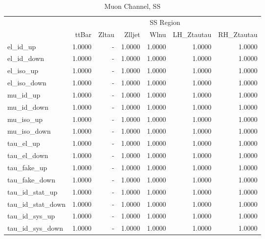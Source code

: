 \documentclass[11pt,oneside,a4paper]{article}
\begin{document}
\begin{table}
\begin{tabular}{lrrrrrr}
 & \multicolumn{6}{c}{SS Region} \\
 & ttBar & Zltau & Zlljet & Wlnu & LH\_Ztautau & RH\_Ztautau \\
el\_id\_up & 1.0000 & - & 1.0000 & 1.0000 & 1.0000 & 1.0000 \\
el\_id\_down & 1.0000 & - & 1.0000 & 1.0000 & 1.0000 & 1.0000 \\
el\_iso\_up & 1.0000 & - & 1.0000 & 1.0000 & 1.0000 & 1.0000 \\
el\_iso\_down & 1.0000 & - & 1.0000 & 1.0000 & 1.0000 & 1.0000 \\
mu\_id\_up & 1.0000 & - & 1.0000 & 1.0000 & 1.0000 & 1.0000 \\
mu\_id\_down & 1.0000 & - & 1.0000 & 1.0000 & 1.0000 & 1.0000 \\
mu\_iso\_up & 1.0000 & - & 1.0000 & 1.0000 & 1.0000 & 1.0000 \\
mu\_iso\_down & 1.0000 & - & 1.0000 & 1.0000 & 1.0000 & 1.0000 \\
tau\_el\_up & 1.0000 & - & 1.0000 & 1.0000 & 1.0000 & 1.0000 \\
tau\_el\_down & 1.0000 & - & 1.0000 & 1.0000 & 1.0000 & 1.0000 \\
tau\_fake\_up & 1.0000 & - & 1.0000 & 1.0000 & 1.0000 & 1.0000 \\
tau\_fake\_down & 1.0000 & - & 1.0000 & 1.0000 & 1.0000 & 1.0000 \\
tau\_id\_stat\_up & 1.0000 & - & 1.0000 & 1.0000 & 1.0000 & 1.0000 \\
tau\_id\_stat\_down & 1.0000 & - & 1.0000 & 1.0000 & 1.0000 & 1.0000 \\
tau\_id\_sys\_up & 1.0000 & - & 1.0000 & 1.0000 & 1.0000 & 1.0000 \\
tau\_id\_sys\_down & 1.0000 & - & 1.0000 & 1.0000 & 1.0000 & 1.0000 \\
\end{tabular}
\caption{Muon Channel, SS}
\end{table}
\end{document}
